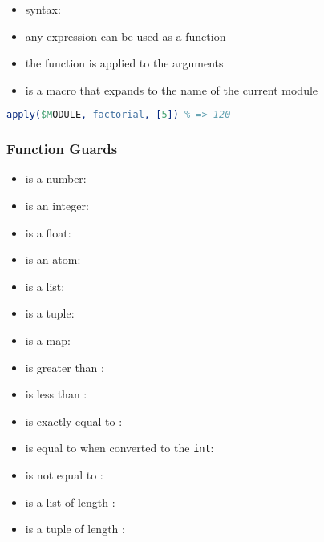 \documentclass[a4paper,landscape,10pt]{article}
\begin{document}
\begin{multicols*}{2}
  \begin{itemize}
    \item syntax: 
    \item any expression can be used as a function
    \item the function is applied to the arguments
    \item {} is a macro that expands to the name of the current module
  \end{itemize}

  \begin{lstlisting}[language=Erlang]
% assumption:factorial is defined in the current module
apply($MODULE, factorial, [5]) % => 120
\end{lstlisting}

  \subsubsection{Function Guards}

  \begin{itemize}
    \item {} is a number: 
    \item {} is an integer: 
    \item {} is a float: 
    \item {} is an atom: 
    \item {} is a list: 
    \item {} is a tuple: 
    \item {} is a map: 
    \item {} is greater than : 
    \item {} is less than : 
    \item {} is exactly equal to : 
    \item {} is equal to  when converted to the \texttt{int}: 
    \item {} is not equal to : 
    \item {} is a list of length : 
    \item {} is a tuple of length : 
  \end{itemize}


\end{multicols*}
\end{document}
